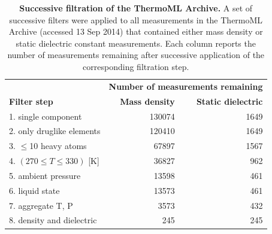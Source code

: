 \documentclass[aps,pre,twocolumn,nofootinbib,superscriptaddress,linenumbers]{revtex4-1}
\begin{document}
\begin{table}
\begin{tabular}{lrr}
\hline
 &  \multicolumn{2}{c}{\bf Number of measurements remaining} \\ \cline{2-3}
{\bf Filter step} &  {\bf Mass density} &  {\bf Static dielectric} \\ 
\hline
1.  single component   &               130074 &                                     1649 \\
2.  only druglike elements  &               120410 &                                     1649 \\
3.  $\le$10 heavy atoms        &                67897 &                                     1567 \\
4.  $(270 \le T \le 330)$ [K]  &                36827 &                                      962 \\
5.  ambient pressure           &                13598 &                                      461 \\
6.  liquid state       &                13573 &                                      461 \\
7.  aggregate T, P     &                 3573 &                                      432 \\
8.  density and dielectric &                  245 &                                      245 \\
\hline
\end{tabular}
\caption{{\bf Successive filtration of the ThermoML Archive.}
A set of successive filters were applied to all measurements in the ThermoML Archive (accessed 13 Sep 2014) that contained either mass density or static dielectric constant measurements.
Each column reports the number of measurements remaining after successive application of the corresponding filtration step.
}
\label{table:ThermoMLSummary}
\end{table}
\end{document}
